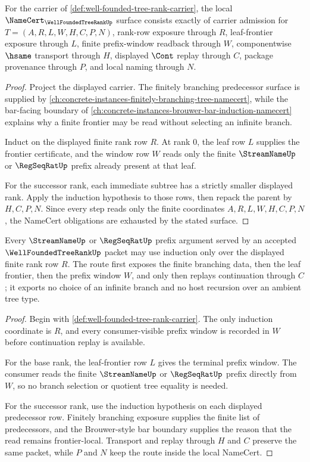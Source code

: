 \begin{theorem}
\label{thm:well-founded-tree-rank-namecert-obligations}
For the carrier of \autoref{def:well-founded-tree-rank-carrier}, the local $\NameCert_{\WellFoundedTreeRankUp}$ surface consists exactly of carrier admission for $T=(A,R,L,W,H,C,P,N)$, rank-row exposure through $R$, leaf-frontier exposure through $L$, finite prefix-window readback through $W$, componentwise $\hsame$ transport through $H$, displayed $\Cont$ replay through $C$, package provenance through $P$, and local naming through $N$.
\end{theorem}
\begin{proof}
Project the displayed carrier. The finitely branching predecessor surface is supplied by \autoref{ch:concrete-instances-finitely-branching-tree-namecert}, while the bar-facing boundary of \autoref{ch:concrete-instances-brouwer-bar-induction-namecert} explains why a finite frontier may be read without selecting an infinite branch.

Induct on the displayed finite rank row $R$. At rank $0$, the leaf row $L$ supplies the frontier certificate, and the window row $W$ reads only the finite $\StreamNameUp$ or $\RegSeqRatUp$ prefix already present at that leaf.

For the successor rank, each immediate subtree has a strictly smaller displayed rank. Apply the induction hypothesis to those rows, then repack the parent by $H,C,P,N$. Since every step reads only the finite coordinates $A,R,L,W,H,C,P,N$, the NameCert obligations are exhausted by the stated surface.
\end{proof}

\begin{theorem}
\label{thm:well-founded-tree-rank-induction-route}
Every $\StreamNameUp$ or $\RegSeqRatUp$ prefix argument served by an accepted $\WellFoundedTreeRankUp$ packet may use induction only over the displayed finite rank row $R$. The route first exposes the finite branching data, then the leaf frontier, then the prefix window $W$, and only then replays continuation through $C$; it exports no choice of an infinite branch and no host recursion over an ambient tree type.
\end{theorem}
\begin{proof}
Begin with \autoref{def:well-founded-tree-rank-carrier}. The only induction coordinate is $R$, and every consumer-visible prefix window is recorded in $W$ before continuation replay is available.

For the base rank, the leaf-frontier row $L$ gives the terminal prefix window. The consumer reads the finite $\StreamNameUp$ or $\RegSeqRatUp$ prefix directly from $W$, so no branch selection or quotient tree equality is needed.

For the successor rank, use the induction hypothesis on each displayed predecessor row. Finitely branching exposure supplies the finite list of predecessors, and the Brouwer-style bar boundary supplies the reason that the read remains frontier-local. Transport and replay through $H$ and $C$ preserve the same packet, while $P$ and $N$ keep the route inside the local NameCert.
\end{proof}

